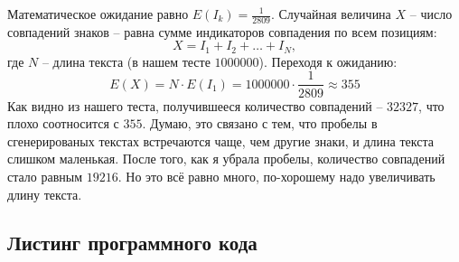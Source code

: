 \documentclass[12pt]{article}
\begin{document}
Математическое ожидание равно $E(I_{k}) = \frac{1}{2809}$. Случайная величина $X$ -- число совпадений знаков -- равна сумме индикаторов совпадения по всем позициям:
$$ X = I_{1} + I_{2} + \ldots + I_{N},$$
где $N$ -- длина текста (в нашем тесте $1000000$). Переходя к ожиданию:
$$ E(X) = N \cdot E(I_{1}) = 1000000 \cdot \frac{1}{2809} \approx 355 $$
Как видно из нашего теста, получившееся количество совпадений -- $32327$, что плохо соотносится с $355$. Думаю, это связано с тем, что пробелы в сгенерированых текстах встречаются чаще, чем другие знаки, и длина текста слишком маленькая. После того, как я убрала пробелы, количество совпадений стало равным $19216$. Но это всё равно много, по-хорошему надо увеличивать длину текста.



\subsection*{Листинг программного кода}
\end{document}
